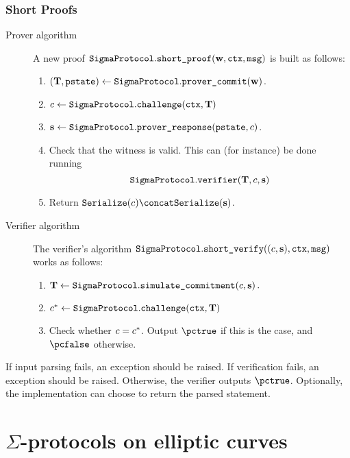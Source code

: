 \documentclass[11pt]{article}
\begin{document}
\subsubsection{Short Proofs}
\begin{description}
\item[Prover algorithm]
A new proof $\texttt{SigmaProtocol}.\texttt{short\_proof}(\mathbf {w},\texttt{ctx}, \texttt{msg})$ is built as follows:
\begin{enumerate}
  \item
     $(\mathbf {T},\texttt{pstate})\gets\texttt{SigmaProtocol}.\texttt{prover\_commit}(\mathbf {w})$.
  \item
   $c \gets \texttt{SigmaProtocol}.\texttt{challenge}(\texttt{ctx}, \mathbf {T})$
  \item
     $\mathbf {s}\gets\texttt{SigmaProtocol}.\texttt{prover\_response}(\texttt{pstate},c)$.
    \item Check that the witness is valid. This can (for instance) be done running \[\texttt{SigmaProtocol}.\texttt{verifier}(\mathbf {T}, c, \mathbf {s})\]
  \item
  Return $\serialize(c) \concat \serialize(\vec s)$.
\end{enumerate}
\item[Verifier algorithm] The verifier's algorithm $\texttt{SigmaProtocol}.\texttt{short\_verify}( (c, \mathbf {s}), \texttt{ctx}, \texttt{msg})$ works as follows:
\begin{enumerate}
  \item $\mathbf {T} \gets \texttt{SigmaProtocol}.\texttt{simulate\_commitment}(c, \mathbf {s})\,.$
  \item $c^* \gets \texttt{SigmaProtocol}.\texttt{challenge}(\texttt{ctx}, \mathbf {T})$
  \item
  Check whether $c=c^*$.
  Output $\accept$ if this is the case, and $\reject$ otherwise.
\end{enumerate}
\end{description}

If input parsing fails, an exception should be raised.
If verification fails, an exception should be raised.
Otherwise, the verifier outputs $\pctrue$. Optionally, the implementation can choose to return the parsed statement.





\section{$\Sigma$-protocols on elliptic curves}
\label{sec:instantiation}
\end{document}
